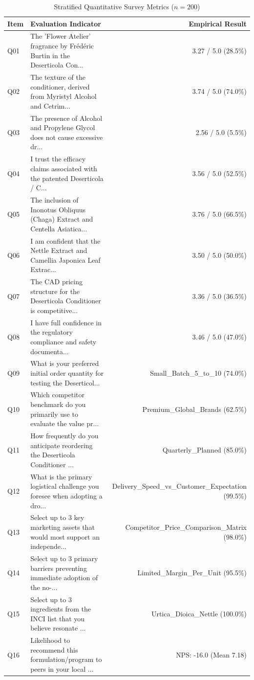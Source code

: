 \documentclass[10pt,twocolumn,a4paper]{article}
\begin{document}
\begin{table}[t]
\centering
\caption{Stratified Quantitative Survey Metrics ($n = 200$)}
\label{tab:metrics}
\small
\begin{tabularx}{\textwidth}{l X r}
\toprule
\textbf{Item} & \textbf{Evaluation Indicator} & \textbf{Empirical Result} \\
\midrule
Q01 & The 'Flower Atelier' fragrance by Frédéric Burtin in the Deserticola Con... & 3.27 / 5.0 (28.5\%) \\
Q02 & The texture of the conditioner, derived from Myristyl Alcohol and Cetrim... & 3.74 / 5.0 (74.0\%) \\
Q03 & The presence of Alcohol and Propylene Glycol does not cause excessive dr... & 2.56 / 5.0 (5.5\%) \\
Q04 & I trust the efficacy claims associated with the patented Deserticola / C... & 3.56 / 5.0 (52.5\%) \\
Q05 & The inclusion of Inonotus Obliquus (Chaga) Extract and Centella Asiatica... & 3.76 / 5.0 (66.5\%) \\
Q06 & I am confident that the Nettle Extract and Camellia Japonica Leaf Extrac... & 3.50 / 5.0 (50.0\%) \\
Q07 & The CAD pricing structure for the Deserticola Conditioner is competitive... & 3.36 / 5.0 (36.5\%) \\
Q08 & I have full confidence in the regulatory compliance and safety documenta... & 3.46 / 5.0 (47.0\%) \\
Q09 & What is your preferred initial order quantity for testing the Deserticol... & Small\_Batch\_5\_to\_10 (74.0\%) \\
Q10 & Which competitor benchmark do you primarily use to evaluate the value pr... & Premium\_Global\_Brands (62.5\%) \\
Q11 & How frequently do you anticipate reordering the Deserticola Conditioner ... & Quarterly\_Planned (85.0\%) \\
Q12 & What is the primary logistical challenge you foresee when adopting a dro... & Delivery\_Speed\_vs\_Customer\_Expectation (99.5\%) \\
Q13 & Select up to 3 key marketing assets that would most support an independe... & Competitor\_Price\_Comparison\_Matrix (98.0\%) \\
Q14 & Select up to 3 primary barriers preventing immediate adoption of the no-... & Limited\_Margin\_Per\_Unit (95.5\%) \\
Q15 & Select up to 3 ingredients from the INCI list that you believe resonate ... & Urtica\_Dioica\_Nettle (100.0\%) \\
Q16 & Likelihood to recommend this formulation/program to peers in your local ... & NPS: -16.0 (Mean 7.18) \\
\bottomrule
\end{tabularx}
\end{table}
\end{document}
